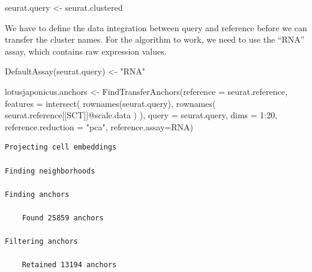 \documentclass[
  letterpaper,
  DIV=11,
  numbers=noendperiod]{scrartcl}
\newenvironment{Shaded}{\begin{snugshade}}{\end{snugshade}}
\newcommand{\AttributeTok}[1]{\textcolor[rgb]{0.40,0.45,0.13}{#1}}
\newcommand{\DecValTok}[1]{\textcolor[rgb]{0.68,0.00,0.00}{#1}}
\newcommand{\FunctionTok}[1]{\textcolor[rgb]{0.28,0.35,0.67}{#1}}
\newcommand{\NormalTok}[1]{\textcolor[rgb]{0.00,0.23,0.31}{#1}}
\newcommand{\OtherTok}[1]{\textcolor[rgb]{0.00,0.23,0.31}{#1}}
\newcommand{\SpecialCharTok}[1]{\textcolor[rgb]{0.37,0.37,0.37}{#1}}
\newcommand{\StringTok}[1]{\textcolor[rgb]{0.13,0.47,0.30}{#1}}
\begin{document}
\begin{Shaded}
\begin{Highlighting}[]
\NormalTok{seurat.query }\OtherTok{\textless{}{-}}\NormalTok{ seurat.clustered}
\end{Highlighting}
\end{Shaded}

We have to define the data integration between query and reference
before we can transfer the cluster names. For the algorithm to work, we
need to use the ``RNA'' assay, which contains raw expression values.

\begin{Shaded}
\begin{Highlighting}[]
\FunctionTok{DefaultAssay}\NormalTok{(seurat.query) }\OtherTok{\textless{}{-}} \StringTok{"RNA"}
\end{Highlighting}
\end{Shaded}

\begin{Shaded}
\begin{Highlighting}[]
\NormalTok{lotusjaponicus.anchors }\OtherTok{\textless{}{-}} \FunctionTok{FindTransferAnchors}\NormalTok{(}\AttributeTok{reference =}\NormalTok{ seurat.reference, }
                                        \AttributeTok{features =} \FunctionTok{intersect}\NormalTok{( }\FunctionTok{rownames}\NormalTok{(seurat.query), }
                                                   \FunctionTok{rownames}\NormalTok{( seurat.reference[[}\StringTok{\textquotesingle{}SCT\textquotesingle{}}\NormalTok{]]}\SpecialCharTok{@}\NormalTok{scale.data ) ),}
                                        \AttributeTok{query =}\NormalTok{ seurat.query, }\AttributeTok{dims =} \DecValTok{1}\SpecialCharTok{:}\DecValTok{20}\NormalTok{, }
                                        \AttributeTok{reference.reduction =} \StringTok{"pca"}\NormalTok{,}
                                        \AttributeTok{reference.assay=}\StringTok{\textquotesingle{}RNA\textquotesingle{}}\NormalTok{)}
\end{Highlighting}
\end{Shaded}

\begin{verbatim}
Projecting cell embeddings

Finding neighborhoods

Finding anchors

    Found 25859 anchors

Filtering anchors

    Retained 13194 anchors
\end{verbatim}
\end{document}
